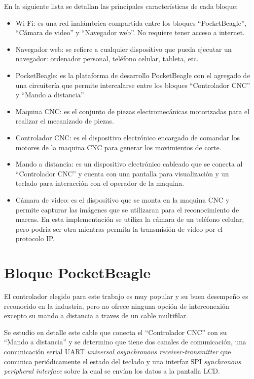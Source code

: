          En la siguiente lista se detallan las principales características de cada bloque:
         \begin{itemize}
            \item{Wi-Fi: es una red inalámbrica compartida entre los bloques ``PocketBeagle'', ``Cámara de video'' y ``Navegador web''. No requiere tener acceso a internet.}
            \item{Navegador web: se refiere a cualquier dispositivo que pueda ejecutar un navegador: ordenador personal, teléfono celular, tableta, etc.}
            \item{PocketBeagle: es la plataforma de desarrollo PocketBeagle con el agregado de una circuitería que permite intercalarse entre los bloques ``Controlador CNC'' y ``Mando a distancia''}
            \item{Maquina CNC: es el conjunto de piezas electromecánicas motorizadas para el realizar el mecanizado de piezas.}
            \item{Controlador CNC: es el dispositivo electrónico encargado de comandar los motores de la maquina CNC para generar los movimientos de corte.}
            \item{Mando a distancia: es un dispositivo electrónico cableado que se conecta al ``Controlador CNC'' y cuenta con una pantalla para visualización y un teclado para interacción con el operador de la maquina.}
            \item{Cámara de video: es el dispositivo que se monta en la maquina CNC y permite capturar las imágenes que se utilizaran para el reconocimiento de marcas. En esta implementación se utiliza la cámara de un teléfono celular, pero podría ser otra mientras permita la transmisión de video por el protocolo IP.}
         \end{itemize}


\section{Bloque PocketBeagle}

   El controlador elegido para este trabajo es muy popular y su buen desempeño es reconocido en la industria, pero no ofrece ninguna opción de interconexión excepto su mando a distancia a traves de un cable multifilar.\par

   Se estudio en detalle este cable que conecta el ``Controlador CNC'' con su ``Mando a distancia'' y se determino que tiene dos canales de comunicación, una comunicación serial UART \textit{universal asynchronous receiver-transmitter} que comunica periódicamente el estado del teclado y una interfaz SPI \textit{synchronous peripheral interface} sobre la cual se envían los datos a la pantalla LCD. \par

